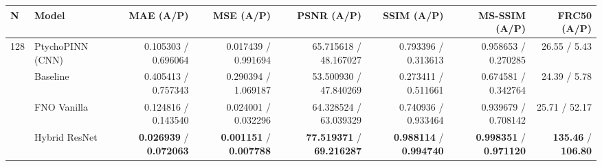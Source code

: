 \begin{tabular}{llrrrrrr}
\toprule
N & Model & MAE (A/P) & MSE (A/P) & PSNR (A/P) & SSIM (A/P) & MS-SSIM (A/P) & FRC50 (A/P) \\
\midrule
128 & PtychoPINN (CNN) & 0.105303 / 0.696064 & 0.017439 / 0.991694 & 65.715618 / 48.167027 & 0.793396 / 0.313613 & 0.958653 / 0.270285 & 26.55 / 5.43 \\
 & Baseline & 0.405413 / 0.757343 & 0.290394 / 1.069187 & 53.500930 / 47.840269 & 0.273411 / 0.511661 & 0.674581 / 0.342764 & 24.39 / 5.78 \\
 & FNO Vanilla & 0.124816 / 0.143540 & 0.024001 / 0.032296 & 64.328524 / 63.039329 & 0.740936 / 0.933464 & 0.939679 / 0.708142 & 25.71 / 52.17 \\
 & Hybrid ResNet & \textbf{0.026939} / \textbf{0.072063} & \textbf{0.001151} / \textbf{0.007788} & \textbf{77.519371} / \textbf{69.216287} & \textbf{0.988114} / \textbf{0.994740} & \textbf{0.998351} / \textbf{0.971120} & \textbf{135.46} / \textbf{106.80} \\
\bottomrule
\end{tabular}
